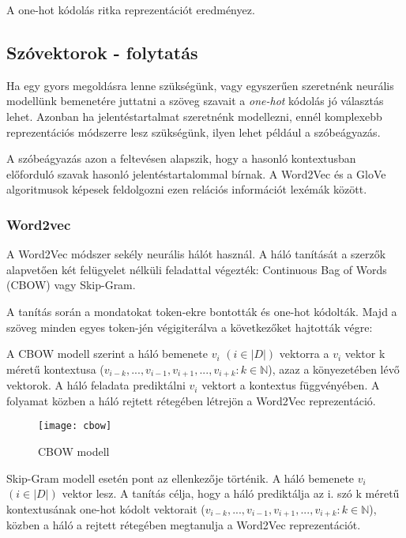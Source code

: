 \begin{note}
	A one-hot kódolás ritka reprezentációt eredményez.
\end{note}

\subsection*{Szóvektorok - folytatás}
Ha egy gyors megoldásra lenne szükségünk, vagy egyszerűen szeretnénk neurális modellünk bemenetére juttatni a szöveg szavait a \textit{one-hot} kódolás jó választás lehet. Azonban ha jelentéstartalmat szeretnénk modellezni, ennél komplexebb reprezentációs módszerre lesz szükségünk, ilyen lehet például a szóbeágyazás.

A szóbeágyazás azon a feltevésen alapszik, hogy a hasonló kontextusban előforduló szavak hasonló jelentéstartalommal bírnak. A Word2Vec és a GloVe algoritmusok képesek feldolgozni ezen relációs információt lexémák között.

\subsubsection{Word2vec}
A Word2Vec módszer sekély neurális hálót használ. A háló tanítását a szerzők alapvetően két felügyelet nélküli feladattal végezték: Continuous Bag of Words (CBOW) vagy Skip-Gram.

A tanítás során a mondatokat token-ekre bontották és one-hot kódolták. Majd a szöveg minden egyes token-jén végigiterálva a következőket hajtották végre:

A CBOW modell szerint a háló bemenete $v_i$
$\left( i \in \left|D\right| \right)$ vektorra a $v_i$ vektor k méretű kontextusa ($v_{i-k},...,v_{i-1}, v_{i+1},..., v_{i+k} : k \in \mathbb{N}$), azaz a könyezetében lévő vektorok. A háló feladata prediktálni $v_i$ vektort a kontextus függvényében. A folyamat közben a háló rejtett rétegében létrejön a Word2Vec reprezentáció.

\begin{figure}[H]
	\centering
	\texttt{[image: cbow]}
	\caption{CBOW modell}
\end{figure}

Skip-Gram modell esetén pont az ellenkezője történik. A háló bemenete $v_i$
$\left( i \in \left|D\right| \right)$ vektor lesz. A tanítás célja, hogy a háló prediktálja az i. szó k méretű kontextusának one-hot kódolt vektorait ($v_{i-k},...,v_{i-1}, v_{i+1},..., v_{i+k} : k \in \mathbb{N}$), közben a háló a rejtett rétegében megtanulja a Word2Vec reprezentációt.

